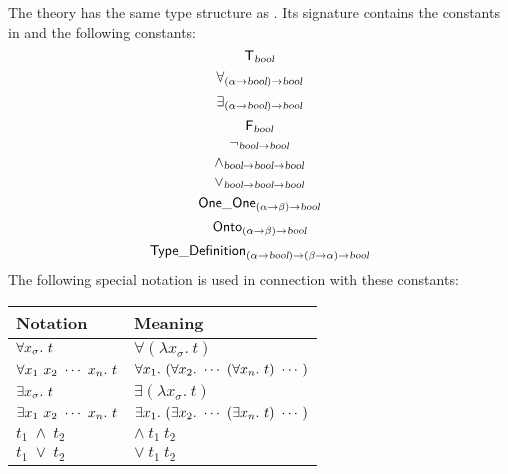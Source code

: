 The theory  has the same type
structure as . Its signature contains the constants in
 and the following constants:
\[
\T_\ty{bool}
\index{T@\ml{T}!abstract form of}\index{truth values, in HOL logic@truth values, in \HOL\ logic!abstract form of}
\]
\[
\forall_{(\alpha\fun\ty{bool})\fun\ty{bool}}
\index{universal quantifier, in HOL logic@universal quantifier, in \HOL\ logic!abstract form of}
\]
\[
\exists_{(\alpha\fun\ty{bool})\fun\ty{bool}}
\index{existential quantifier, in HOL logic@existential quantifier, in \HOL\ logic!abstract form of}
\]
\[
\F_\ty{bool}
\index{F@\ml{F}!abstract form of}
\]
\[
\neg_{\ty{bool}\fun\ty{bool}}
\index{negation, in HOL logic@negation, in \HOL\ logic!abstract form of}
\]
\[
\wedge_{\ty{bool}\fun\ty{bool}\fun\ty{bool}}
\index{conjunction, in HOL logic@conjunction, in \HOL\ logic!abstract form of}
\]
\[
\vee_{\ty{bool}\fun\ty{bool}\fun\ty{bool}}
\index{disjunction, in HOL logic@disjunction, in \HOL\ logic!abstract form of}
\]
\[
\OneOne_{(\alpha\fun\beta)\fun\ty\bool}
\index{one-to-one predicate, in HOL logic@one-to-one predicate, in \HOL\ logic!abstract form of}
\]
\[
\Onto_{(\alpha\fun\beta)\fun\ty\bool}
\index{onto predicate, in HOL logic@onto predicate, in \HOL\ logic!abstract form of}
\]
\[
{\sf Type\_Definition}_{(\alpha{\to}\textsl{bool}){\to}(\beta{\to}\alpha){\to}\textsl{bool}}
\]
The following special notation is used in connection with these constants:
\begin{center}
\begin{tabular}{|l|l|}\hline
{\rm Notation} & {\rm Meaning}\\ \hline $\forall x_{\sigma}.\ t$ &
$\forall(\lambda x_{\sigma}.\ t)$\\ \hline $\uquant{x_1\ x_2\ \cdots\
x_n}t$ & $\forall x_1.\ (\forall x_2.\  \cdots\ (\forall x_n.\ t)
\ \cdots\ )$\\ \hline
$\exists x_{\sigma}.\ t$
  & $\exists(\lambda x_{\sigma}.\ t)$\\ \hline
$\equant{x_1\ x_2\ \cdots\ x_n}t$
  & $\exists x_1.\ (\exists x_2.\  \cdots\ (\exists x_n.\ t)
\ \cdots\ )$\\ \hline
$t_1\ \wedge\ t_2$  & $\wedge\ t_1\ t_2$\\ \hline
$t_1\ \vee\ t_2$  & $\vee\ t_1\ t_2$\\ \hline
\end{tabular}\end{center}

